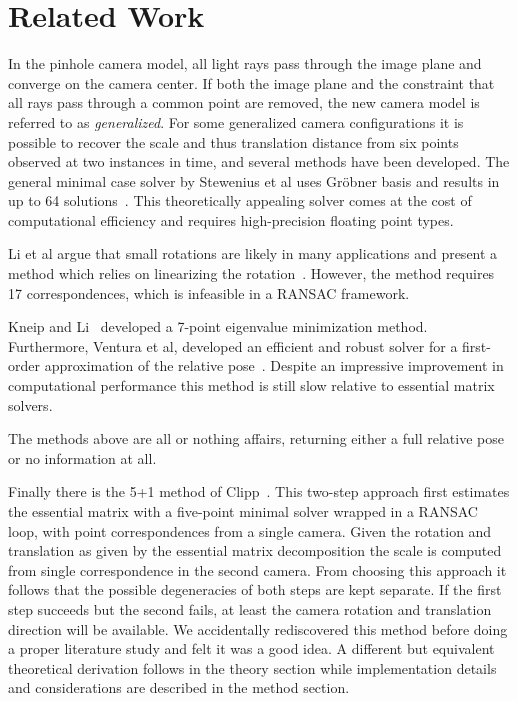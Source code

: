 \section{Related Work}
In the pinhole camera model, all light rays pass through the image plane and converge on the camera center. If both the image plane and the constraint that all rays pass through a common point are removed, the new camera model is referred to as \textit{generalized}. For some generalized camera configurations it is possible to recover the scale and thus translation distance from six points observed at two instances in time, and several methods have been developed. The general minimal case solver by Stewenius et al uses Gr\"obner basis and results in up to 64 solutions~\cite{stewenius2005solutions}. This theoretically appealing solver comes at the cost of computational efficiency and requires high-precision floating point types. 

Li et al argue that small rotations are likely in many applications and present a method which relies on linearizing the rotation~\cite{li2008linear}. However, the method requires 17 correspondences, which is infeasible in a RANSAC framework. 

Kneip and Li~\cite{kneip2014efficient} developed a 7-point eigenvalue minimization method. Furthermore, Ventura et al, developed an efficient and robust solver for a first-order approximation of the relative pose~\cite{ventura2015efficient}. Despite an impressive improvement in computational performance this method is still slow relative to essential matrix solvers. 

The methods above are all or nothing affairs, returning either a full relative pose or no information at all.

Finally there is the 5+1 method of Clipp~\cite{clipp2008robust}. This two-step approach first estimates the essential matrix with a five-point minimal solver wrapped in a RANSAC loop, with point correspondences from a single camera. Given the rotation and translation as given by the essential matrix decomposition the scale is computed from single correspondence in the second camera. From choosing this approach it follows that the possible degeneracies of both steps are kept separate. If the first step succeeds but the second fails, at least the camera rotation and translation direction will be available.  We accidentally rediscovered this method before doing a proper literature study and felt it was a good idea. A different but equivalent theoretical derivation follows in the theory section while implementation details and considerations are described in the method section. 

